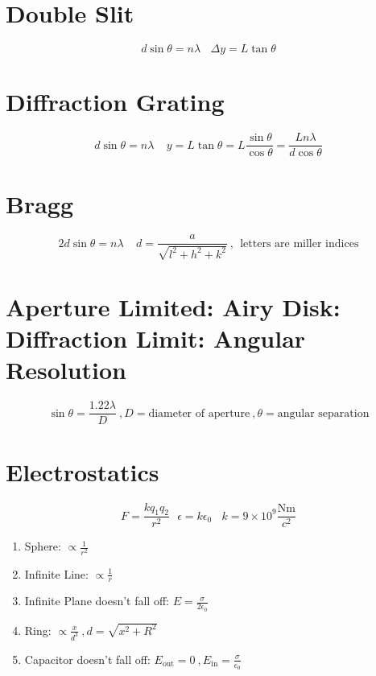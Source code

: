\documentclass[10pt,a4paper]{article}
\begin{document}
\section{Double Slit} %
\label{sec:double_slit}
\begin{equation}
    d \sin \theta = n \lambda ~~~~ \Delta y = L \tan \theta
\end{equation}

\section{Diffraction Grating} %
\label{sec:diffraction_grating}
\begin{equation}
    d \sin \theta = n \lambda ~~~~~ y = L \tan \theta = L \frac{\sin \theta}{\cos \theta} = \frac{L n \lambda}{d \cos \theta}
\end{equation}

\section{Bragg} %
\label{sec:bragg}
\begin{equation}
    2d\sin \theta = n\lambda~~~~~ d= \frac{a}{\sqrt{l^2 + h^2 + k^2}}~, ~~ \textrm{letters are miller indices}
\end{equation}

\section{Aperture Limited: Airy Disk: Diffraction Limit: Angular Resolution} %
\label{sec:aperture_limited_airy_disk_diffraction_limit_angular_resolution}
\begin{equation}
    \sin \theta = \frac{1.22 \lambda}{D} ~, D=\textrm{diameter of aperture}~, \theta = \textrm{angular separation}
\end{equation}

\section{Electrostatics} %
\label{sec:electrostatics}
\begin{equation}
    F = \frac{kq_1q_2}{r^2}~~~ \epsilon = k \epsilon_0~~~~ k = 9 \times 10^9 \frac{\textrm{Nm}}{c^2}
\end{equation}
\begin{enumerate}
    \item Sphere: $\propto \frac{1}{r^2}$ 
    \item Infinite Line: $\propto \frac{1}{r}$
    \item Infinite Plane doesn't fall off: $E = \frac{\sigma}{2 \epsilon_0}$
    \item Ring: $ \propto \frac{x}{d^3}~,d = \sqrt{x^2 + R^2}$
    \item Capacitor doesn't fall off: $E_{\textrm{out}} = 0~, E_{\textrm{in}} = \frac{\sigma}{\epsilon_0}$
\end{enumerate}
\end{document}
